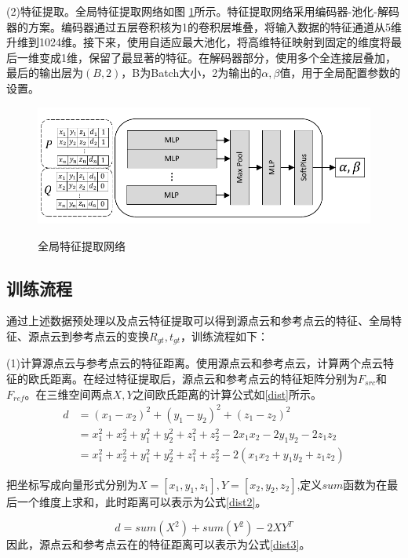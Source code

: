 (2)特征提取。全局特征提取网络如图 \ref{全局特征提取网络}所示。特征提取网络采用编码器-池化-解码器的方案。编码器通过五层卷积核为1的卷积层堆叠，将输入数据的特征通道从5维升维到1024维。接下来，使用自适应最大池化，将高维特征映射到固定的维度将最后一维变成1维，保留了最显著的特征。在解码器部分，使用多个全连接层叠加，最后的输出层为$(B,2)$，B为Batch大小，2为输出的$\alpha,\beta$值，用于全局配置参数的设置。
\begin{figure}[htbp]
	\centering
	\includegraphics{figures/全局特征提取网络.pdf}\\
	\caption{全局特征提取网络}
	\label{全局特征提取网络}
\end{figure}


\subsection{训练流程}
通过上述数据预处理以及点云特征提取可以得到源点云和参考点云的特征、全局特征、源点云到参考点云的变换$R_{gt},t_{gt}$，训练流程如下：
\par
(1)计算源点云与参考点云的特征距离。使用源点云和参考点云，计算两个点云特征的欧氏距离。在经过特征提取后，源点云和参考点云的特征矩阵分别为$F_{src}$和$F_{ref}$。在三维空间两点$X,Y$之间欧氏距离的计算公式如\eqref{dist}所示。
\begin{equation}
	\label{dist}
	\begin{aligned}
		d &= (x_1-x_2)^2 +  (y_1-y_2)^2 +  (z_1-z_2)^2\\
		&= x_1^2+x_2^2 +  y_1^2+y_2^2  +  z_1^2+z_2^2 - 2x_1x_2 - 2y_1y_2 - 2z_1z_2\\
		&=x_1^2+x_2^2 +  y_1^2+y_2^2  +  z_1^2+z_2^2 - 2(x_1x_2+y_1y_2+z_1z_2)
	\end{aligned}
\end{equation}

把坐标写成向量形式分别为$X=[x_1, y_1, z_1],Y=[x_2,y_2,z_2]$,定义$sum$函数为在最后一个维度上求和，此时距离可以表示为公式\eqref{dist2}。

\begin{equation}
	\label{dist2}
	d = sum(X^2) + sum(Y^2) - 2XY^T
\end{equation}
因此，源点云和参考点云在的特征距离可以表示为公式\eqref{dist3}。

